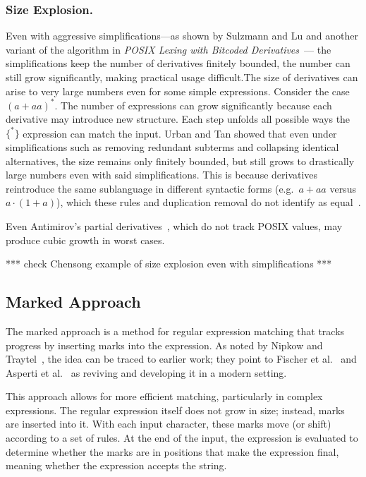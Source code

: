 \documentclass[12pt]{article}
\begin{document}
\subsubsection{Size Explosion.} %

Even with aggressive simplifications—as shown by Sulzmann and Lu and another variant of the algorithm in \emph{POSIX Lexing 
with Bitcoded Derivatives}~\cite{TanAndUrban2023}— the simplifications keep the number of derivatives finitely bounded, the
number can still grow significantly, making practical usage difficult.The size of derivatives can arise to very large numbers
even for some simple expressions. Consider the case $ (a + aa)^*$. The number of expressions can grow significantly because each 
derivative may introduce new structure. Each step  unfolds all possible ways the $\{^*\}$ expression can match the input. Urban
and Tan showed that even under simplifications such as removing redundant subterms and collapsing identical alternatives, the size
remains only finitely bounded, but still grows to drastically large numbers even with said simplifications. This is because 
derivatives reintroduce the same sublanguage in different syntactic forms (e.g.\ $a+aa$ versus $a\cdot(1+a)$), which these rules 
and duplication removal do not identify as equal~\cite{TanAndUrban2023}.

Even Antimirov’s partial derivatives~\cite{Antimirov1996}, which do not track POSIX values, may produce cubic growth in worst
cases.~\cite{Antimirov1996}

*** check Chensong example of size explosion even with simplifications ***

\subsection{Marked Approach}

The marked approach is a method for regular expression matching that tracks progress by inserting marks into the expression. 
As noted by Nipkow and Traytel~\cite{NipkowTraytel2014}, the idea can be traced to earlier work; 
they point to Fischer et al.~\cite{Fischer2010} and Asperti et al.~\cite{Asperti2010} as reviving and developing it in a modern setting.

This approach allows for more efficient matching, particularly in complex expressions. The regular expression
itself does not grow in size; instead, marks are inserted into it. With each input character, these marks move (or shift) according
to a set of rules. At the end of the input, the expression is evaluated to determine whether the marks are in positions that make the
expression final, meaning whether the expression accepts the string.
 
\end{document}
